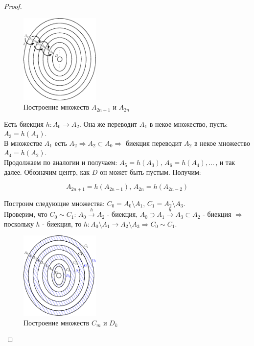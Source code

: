 \documentclass[12pt]{article}
\theoremstyle{definition}
\begin{document}
\begin{proof}
\begin{figure}[H]
	\centering
	\includegraphics[width=0.35\textwidth]{5_7.eps}	
	\caption{Построение множеств $A_{2n+1}$ и $A_{2n}$} 
	\label{5_7}
\end{figure}	

Есть биекция $h \colon A_0 \rightarrow A_2$. Она же переводит $A_1$ в некое множество, пусть: $A_3 = h(A_1)$.\\
В множестве $A_1$ есть $A_2 \Rightarrow A_2 \subset A_0 \Rightarrow$ биекция переводит $A_2$ в некое множество $A_4 = h(A_2)$.\\
Продолжаем по аналогии и получаем: $A_5 = h(A_3), \, A_6 = h(A_4), \dotsc \, $, и так далее. Обозначим центр, как $D$ он может быть пустым. Получим:

$$A_{2n+1} = h(A_{2n-1}), \, A_{2n} = h(A_{2n-2})$$

Построим следующие множества: $C_0 = A_0 \setminus A_1$, $C_1 = A_2 \setminus A_3$.\\ 
Проверим, что $C_0 \sim C_1$: $A_0 \xrightarrow{h} A_2$ - биекция, $A_0 \supset A_1 \xrightarrow{h} A_3 \subset A_2$ - биекция $\Rightarrow$ поскольку $h$ - биекция, то $h\colon A_0 \setminus A_1 \rightarrow A_2 \setminus A_3 \Rightarrow C_0 \sim C_1$.

\begin{figure}[H]
	\centering
	\includegraphics[width=0.35\textwidth]{5_8.eps}	
	\caption{Построение множеств $C_{m}$ и $D_{k}$} 
	\label{5_8}
\end{figure}


\end{proof}
\end{document}
